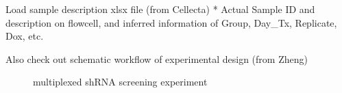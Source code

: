 \documentclass[11pt]{article}
\begin{document}
Load sample description xlsx file (from Cellecta) * Actual Sample ID and
description on flowcell, and inferred information of Group, Day\_Tx,
Replicate, Dox, etc.

Also check out schematic workflow of experimental design (from Zheng)

\begin{figure}
\centering
{}
\caption{multiplexed shRNA screening experiment}
\end{figure}
\end{document}
